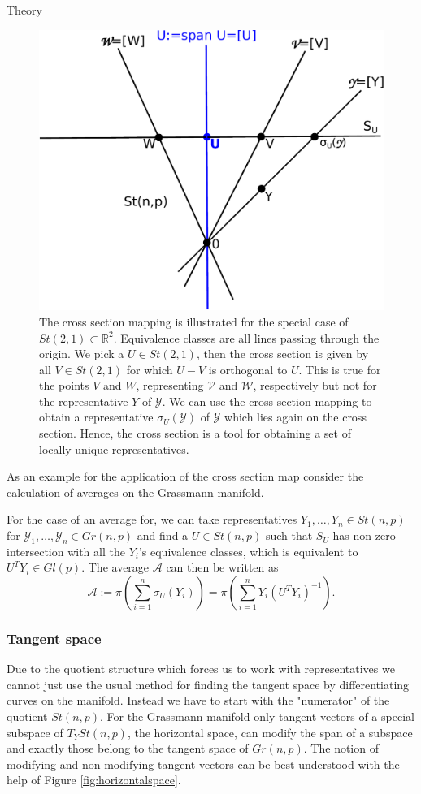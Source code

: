 \begin{chapter}{Theory}
\begin{figure}[h!]
        \centering
	    \includegraphics[width=0.5\linewidth]{./figures/theory/affinecrosssection.pdf}
	\caption[Affine cross section map]{ The cross section mapping is illustrated for the special
	case of $St(2,1)\subset\mathbb{R}^2$. Equivalence classes are all lines passing through the origin.
	We pick a $U\in St(2,1)$, then the cross section is given by all $V\in St(2,1)$ for which $U-V$ is
	orthogonal to $U$. This is true for the points $V$ and $W$, representing $\mathcal{V}$ and $\mathcal{W}$,
	respectively but not for the representative $Y$ of $\mathcal{Y}$. 
	We can use the cross section mapping to obtain a representative $\sigma_U(\mathcal{Y})$ of $\mathcal{Y}$
	which lies again on the cross section. Hence, the cross section is a tool for obtaining a set 
	of locally unique 	representatives.	
	}
	\label{fig:crosssection}
\end{figure}
As an example for the application of the cross section map consider the calculation of averages on the
Grassmann manifold. 
\begin{example}[Average]
For the case of an average for, we can take representatives $Y_1,\ldots,Y_n\in St(n,p)$ for $\mathcal{Y}_1,\ldots,\mathcal{Y}_n\in Gr(n,p)$
and find a $U\in St(n,p)$ such that $S_U$ has non-zero intersection with all the $Y_i$'s equivalence classes, which is equivalent
to $U^TY_i\in Gl(p)$. The average $\mathcal{A}$ can then be written as
\begin{equation}
    \mathcal{A} := \pi\left(\sum_{i=1}^{n}\sigma_U(Y_i)\right)=\pi\left(\sum_{i=1}^{n}Y_i(U^{T}Y_i)^{-1}\right).
\end{equation}
\end{example}

\subsubsection{Tangent space} %
\label{ssub:Tangent space}
Due to the quotient structure which forces us to work with representatives we cannot just use the usual method for finding the tangent space by differentiating
curves on the manifold. Instead we have to start with the "numerator" of the quotient $St(n,p)$. For the Grassmann manifold only tangent vectors of a special subspace of $T_YSt(n,p)$,
the horizontal space, can modify the span of a subspace and exactly those belong to the tangent space of $Gr(n,p)$. 
The notion of modifying and non-modifying tangent vectors can be best understood with the help of Figure \ref{fig:horizontalspace}.\\


\end{chapter}
